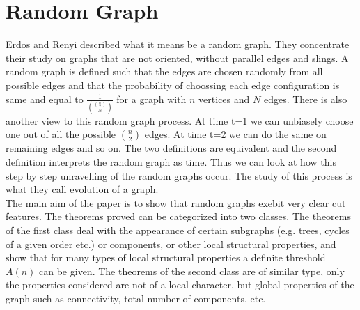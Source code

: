 \section{Random Graph}
Erdos and Renyi described what it means be a random graph. They concentrate their study on graphs that are not oriented, without parallel edges and slings. A random graph is defined such that the edges are chosen randomly from all possible edges and that the probability of choossing each edge configuration is same and equal to $\frac{1}{\binom{\binom{n}{2}}{N}}$ for a graph with $n$ vertices and $N$ edges. There is also another view to this random graph process. At time t=1 we can unbiasely choose one out of all the possible $\binom{n}{2}$ edges. At time t=2 we can do the same on remaining edges and so on. The two definitions are equivalent and the second definition interprets the random graph as time. Thus we can look at how this step by step unravelling of the random graphs occur. The study of this process is what they call evolution of a graph.
\\
The main aim of the paper is to show that random graphs exebit very clear cut features. The theorems proved can be categorized into two classes. The theorems of the first class deal with the appearance of certain subgraphs (e.g. trees, cycles of a given order etc.) or components, or other local structural properties, and show that for many types of local structural properties a definite threshold $A(n)$ can be given. The theorems of the second class are of similar type, only the properties considered are not of a local character, but global properties of the graph such as connectivity, total number of components, etc.